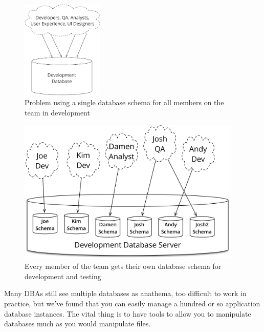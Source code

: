 \documentclass[12pt]{article}
\begin{document}
\begin{figure}[H]
  \begin{center}
    \includegraphics[width=0.35\textwidth]{single_database_problem}
  \end{center}
  \caption{Problem using a single database schema for all members on the team in development}
  \label{fig:single-database-problem}
\end{figure}

\begin{figure}[H]
  \begin{center}
    \includegraphics[width=0.95\textwidth]{multiple_database_for_everyone}
  \end{center}
  \caption{Every member of the team gets their own database schema for development and testing}
  \label{fig:multiple-database-for-everyone}
\end{figure}

Many DBAs still see multiple databases as anathema, too difficult to
work in practice, but we've found that you can easily manage a hundred
or so application database instances. The vital thing is to have tools
to allow you to manipulate databases much as you would manipulate files.
\end{document}

